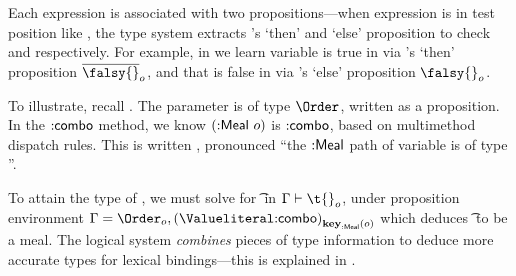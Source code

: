 Each expression is associated with two propositions---when expression
 is in test position like
,
the type system extracts 's `then' and `else' proposition to check
 and  respectively.
For example, in 
we learn variable {} is true in  via {}'s `then' proposition $\notprop{\falsy{}}{\makelocal{o}}$, and 
that {} is false in  via {}'s `else' proposition $\isprop{\falsy{}}{\makelocal{o}}$.

To illustrate, recall .
The parameter  is of type $\Order$,
written
{}
as a proposition.
%
In the ${{\mathsf{\mathbin{:}combo}}}$ method, we know
${({\mathsf{\mathbin{:}Meal}}\ o)}$ is ${{\mathsf{\mathbin{:}combo}}}$,
based on multimethod dispatch rules. This is written
  {},
pronounced ``the ${{\mathsf{\mathbin{:}Meal}}}$ path of variable  is of type
{}''.

To attain the type of , 
we must solve for \t{} in
$
{ \inpropenv 
  {\propenv{}}
  {\isprop {\t{}} {\makelocal{o}}}}
$,
under proposition environment
$
\propenv{} = {{\isprop{\Order}{\makelocal{o}}},
    {\isprop{\Value{\makekw{combo}}}{\path{\keype{\makekw{Meal}}}{\makelocal{o}}}}}
$
which deduces \t{} to be a {} meal.
The logical
system \emph{combines} pieces of type information to deduce more accurate types for lexical
bindings---this is explained in .

%





